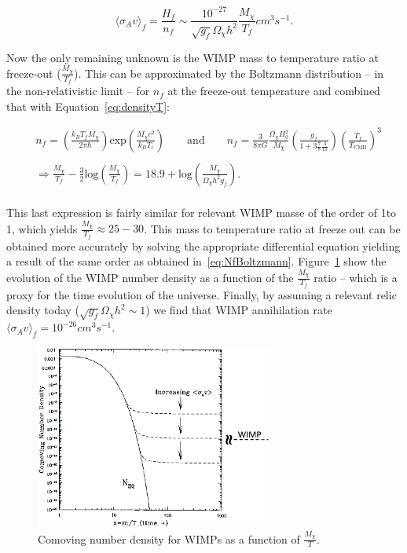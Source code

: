 \begin{equation}
\label{eq:RELICDENSITY}
\langle \sigma_{A}v\rangle_{f} = \frac{H_{f}}{n_{f}} \sim \frac{10^{-27}}{\sqrt{g_{f}}\Omega_{\chi}h^{2}}\frac{M_{\chi}}{T_{f}}\unit{cm}^{3}\unit{s}^{-1}.
\end{equation}

Now the only remaining unknown is the WIMP mass to temperature ratio
at freeze-out ($\frac{M_{\chi}}{T_{f}}$). This can be approximated by
the Boltzmann distribution -- in the non-relativistic limit --  for $n_{f}$ at the freeze-out temperature
and combined that with Equation~\ref{eq:densityT}:

\begin{equation}
\label{eq:NfBoltzmann}
\begin{aligned}
       &
n_{f} = \left(\frac{k_{B}T_{f}M_{\chi}}{2\pi
    \hbar}\right)\mathrm{exp}\left(\frac{M_{\chi}c^{2}}{k_{B}T_{i}}\right)
\qquad \text{and} \qquad n_{f} = \frac{3}{8\pi G}\frac{\Omega_{\chi}H^{2}_{0}}{M_{\chi}}\left(\frac{g_{f}}{1+3\frac{7}{8}\frac{4}{11}}\right)\left(\frac{T_{f}}{T_{\mathrm{CMB}}}\right)^{3}\\ \\
& \Rightarrow \frac{M_{\chi}}{T_{f}}
-\frac{3}{2}\mathrm{log}\left(\frac{M_{\chi}}{T_{f}}\right) = 18.9 +
\mathrm{log}\left(\frac{M_{\chi}}{\Omega_{\chi}h^{2}g_{f}}\right).\\
\end{aligned}
\end{equation}

This last expression is fairly similar for relevant WIMP masse of the
order of 1\GeV to 1\TeV, which yields $\frac{M_{\chi}}{T_{f}} \approx
25-30$. This mass to temperature ratio at freeze out can be obtained
more accurately by solving the appropriate differential equation
yielding a result of the same order as obtained
in~\ref{eq:NfBoltzmann}. Figure~\ref{fig:freezeout} show the evolution
of the WIMP number density as a function of the
$\frac{M_{\chi}}{T_{f}}$ ratio -- which is a proxy for the time
evolution of the universe. Finally, by assuming a relevant relic
density today ($\sqrt{g_{f}}\Omega_{\chi}h^{2}\sim 1$) we find that
WIMP annihilation rate $\langle \sigma_{A}v\rangle_{f} =
10^{-26}\unit{cm}^{3}\unit{s}^{-1}$.
\begin{figure}
 \centering
\includegraphics[width=0.7\textwidth]{IntroFigures/freezeout.png}
\caption{Comoving number density for WIMPs as a function of $\frac{M_{\chi}}{T}$.\label{fig:freezeout}}
\end{figure}

